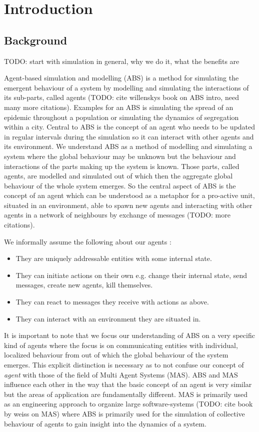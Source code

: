 \chapter{Introduction}
\label{chap:intro}

\section{Background}
TODO: start with simulation in general, why we do it, what the benefits are

Agent-based simulation and modelling (ABS) is a method for simulating the emergent behaviour of a system by modelling and simulating the interactions of its sub-parts, called agents (TODO: cite willenskys book on ABS intro, need many more citations). Examples for an ABS is simulating the spread of an epidemic throughout a population or simulating the dynamics of segregation within a city. Central to ABS is the concept of an agent who needs to be updated in regular intervals during the simulation so it can interact with other agents and its environment.
We understand ABS as a method of modelling and simulating a system where the global behaviour may be unknown but the behaviour and interactions of the parts making up the system is known. Those parts, called agents, are modelled and simulated out of which then the aggregate global behaviour of the whole system emerges. So the central aspect of ABS is the concept of an agent which can be understood as a metaphor for a pro-active unit, situated in an environment, able to spawn new agents and interacting with other agents in a network of neighbours by exchange of messages \cite{wooldridge_introduction_2009} (TODO: more citations). 

We informally assume the following about our agents \cite{wooldridge_introduction_2009}:

\begin{itemize}
	\item They are uniquely addressable entities with some internal state.
	\item They can initiate actions on their own e.g. change their internal state, send messages, create new agents, kill themselves.
	\item They can react to messages they receive with actions as above.
	\item They can interact with an environment they are situated in.
\end{itemize} 

It is important to note that we focus our understanding of ABS on a very specific kind of agents where the focus is on communicating entities with individual, localized behaviour from out of which the global behaviour of the system emerges. This explicit distinction is necessary as to not confuse our concept of \textit{agent} with those of the field of Multi Agent Systems (MAS). ABS and MAS influence each other in the way that the basic concept of an agent is very similar but the areas of application are fundamentally different. MAS is primarily used as an engineering approach to organize large software-systems (TODO: cite book by weiss on MAS) where ABS is primarily used for the simulation of collective behaviour of agents to gain insight into the dynamics of a system.

